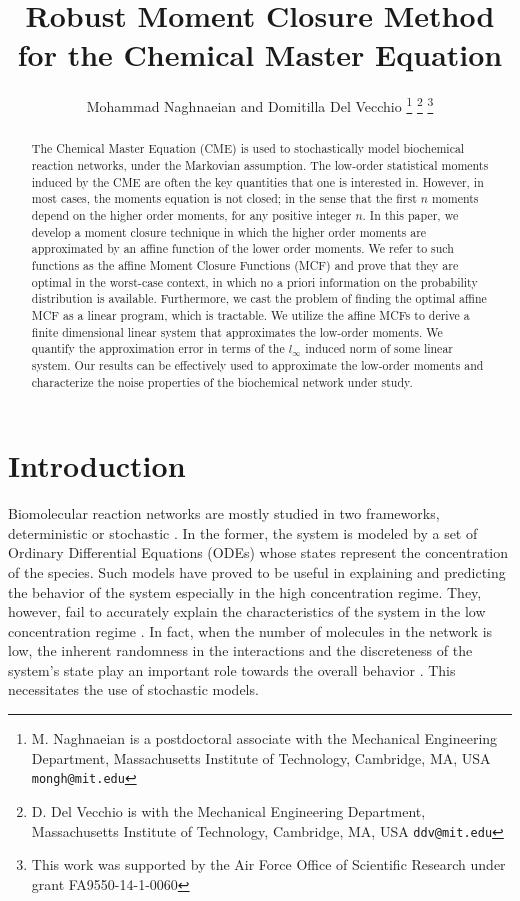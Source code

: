 \documentclass[letterpaper, 10 pt, conference]{ieeeconf}
\begin{document}
\title{{\LARGE \textbf{Robust Moment Closure Method for the Chemical Master
Equation}}}
\author{Mohammad Naghnaeian and Domitilla Del Vecchio \thanks{%
M. Naghnaeian is a postdoctoral associate with the Mechanical Engineering
Department, Massachusetts Institute of Technology, Cambridge, MA, USA \texttt%
{\small mongh@mit.edu}} \thanks{%
D. Del Vecchio is with the Mechanical Engineering Department, Massachusetts
Institute of Technology, Cambridge, MA, USA \texttt{\small ddv@mit.edu}} 
\thanks{%
This work was supported by the Air Force Office of Scientific Research under
grant FA9550-14-1-0060}}
\maketitle

\begin{abstract}
The Chemical Master Equation (CME) is used to stochastically model
biochemical reaction networks, under the Markovian assumption. The low-order
statistical moments induced by the CME are often the key quantities that one
is interested in. However, in most cases, the moments equation is not
closed; in the sense that the first $n$ moments depend on the higher order
moments, for any positive integer $n$. In this paper, we develop a moment
closure technique in which the higher order moments are approximated by an
affine function of the lower order moments. We refer to such functions as
the affine Moment Closure Functions (MCF) and prove that they are optimal in
the worst-case context, in which no a priori information on the probability
distribution is available. Furthermore, we cast the problem of finding the
optimal affine MCF as a linear program, which is tractable. We utilize the
affine MCFs to derive a finite dimensional linear system that approximates
the low-order moments. We quantify the approximation error in terms of the $%
l_{\infty }$ induced norm of some linear system. Our results can be
effectively used to approximate the low-order moments and characterize the
noise properties of the biochemical network under study.
\end{abstract}

\thispagestyle{empty} \pagestyle{empty}

\section{Introduction}

Biomolecular reaction networks are mostly studied in two frameworks,
deterministic or stochastic \cite{oppenheim1969stochastic}. In the former,
the system is modeled by a set of Ordinary Differential Equations (ODEs)
whose states represent the concentration of the species. Such models have
proved to be useful in explaining and predicting the behavior of the system
especially in the high concentration regime. They, however, fail to
accurately explain the characteristics of the system in the low
concentration regime \cite{kurtz1972relationship}. In fact, when the number
of molecules in the network is low, the inherent randomness in the
interactions and the discreteness of the system's state play an important
role towards the overall behavior \cite{rao2002control}. This necessitates
the use of stochastic models.
\end{document}
